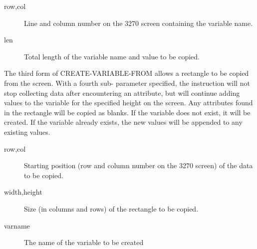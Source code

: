 \documentclass[letterpaper,10pt,english]{sphinxmanual}
\begin{document}
\begin{sphinxVerbatim}[commandchars=\\\{\}]
     
\end{sphinxVerbatim}
\begin{description}
\item[{row,col}] \leavevmode
Line and column number on the 3270 screen containing the variable name.

\item[{len}] \leavevmode
Total length of the variable name and value to be copied.

\end{description}

The third form of CREATE-VARIABLE-FROM allows a rectangle to be copied from the screen. With a fourth sub- parameter specified, the instruction will not stop collecting data after encountering an     attribute, but will continue adding values to the variable for the specified height on the screen. Any attributes found in the rectangle will be copied as blanks. If the variable does not exist, it will be
created. If the variable already exists, the new values will be appended to any existing values.

\begin{sphinxVerbatim}[commandchars=\\\{\}]
       
\end{sphinxVerbatim}
\begin{description}
\item[{row,col}] \leavevmode
Starting position (row and column number on the 3270 screen) of the
data to be copied.

\item[{width,height}] \leavevmode
Size (in columns and rows) of the rectangle to be copied.

\item[{varname}] \leavevmode
The name of the variable to be created

\end{description}
\end{document}
